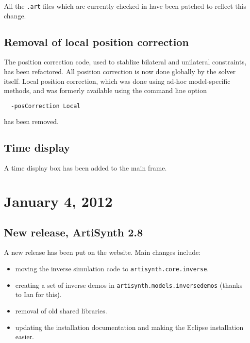 \documentclass{article}
\begin{document}
All the {\tt .art} files which are currently checked in have been patched
to reflect this change.

\subsection*{Removal of local position correction}

The position correction code, used to stablize bilateral and
unilateral constraints, has been refactored. All position correction
is now done globally by the solver itself. Local position correction,
which was done using ad-hoc model-specific methods, and was formerly
available using the command line option

\begin{verbatim}
  -posCorrection Local
\end{verbatim}

has been removed.

\subsection*{Time display}

A time display box has been added to the main frame.

\section*{January 4, 2012}

\subsection*{New release, ArtiSynth 2.8}

A new release has been put on the website. Main changes include:

\begin{itemize}

\item moving the inverse simulation code to {\tt artisynth.core.inverse}.

\item creating a set of inverse demos in {\tt artisynth.models.inversedemos}
  (thanks to Ian for this).

\item removal of old shared libraries.

\item updating the installation documentation and making the Eclipse
  installation easier.

\end{itemize}
\end{document}
